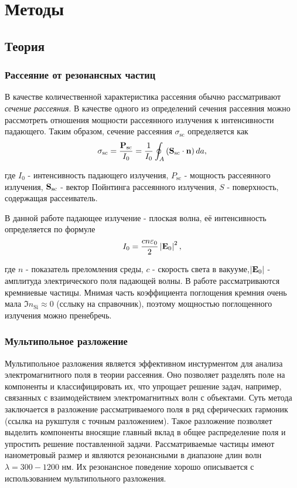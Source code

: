 \chapter{Методы}


\section{Теория}\label{sec:theory}

\subsection{Рассеяние от резонансных частиц}\label{subsec:scat_cs}

В качестве количественной характеристика рассеяния обычно рассматривают \textit{сечение рассеяния}. В качестве одного из определений сечения рассеяния можно рассмотреть отношения мощности рассеянного излучения к интенсивности падающего. Таким образом, сечение рассеяния $\sigma_{\text{sc}}$ определяется как
\begin{equation}
    \sigma_{\text{sc}} = \frac{\vb{P_{\text{sc}}}}{I_0} = \frac{1}{I_0} \oint_A  \left(  \mathbf{S}_{\text{sc}} \cdot \vb{n} \right) da,
\end{equation}

где $I_0$ - интенсивность падающего излучения, $P_{\text{sc}}$ - мощность рассеянного излучения, $\vb{S}_{\text{sc}}$ - вектор Пойнтинга рассеянного излучения, $S$ - поверхность, содержащая рассеиватель.

В данной работе падающее излучение - плоская волна, её интенсивность определяется по формуле
\begin{equation}
    I_0 = \frac{c n \varepsilon_0}{2} \left| \vb{E}_0 \right|^2,
\end{equation}

где $n$ - показатель преломления среды, $c$ - скорость света в вакууме,$\left| \vb{E}_0 \right|$ - амплитуда электрического поля падающей волны.
В работе рассматриваются кремниевые частицы. Мнимая часть коэффициента поглощения кремния очень мала $\Im{n_{\text{Si}}} \approx 0$ (сслыку на справочник), поэтому мощностью поглощенного излучения можно пренебречь. 

\subsection{Мультипольное разложение}\label{subsec:mult_decomp}

Мультипольное разложения является эффективном инстурментом для анализа электромагнитного поля в теории рассеяния. Оно позволяет разделять поле на компоненты и классифицировать их, что упрощает решение задач, например, связанных с взаимодействием электромагнитных волн с объектами. Суть метода заключается в разложение рассматриваемого поля в ряд сферических гармоник (ссылка на  рукштуля с точным разложением). Такое разложение позволяет выделить компоненты вносящие главный вклад в общее распределение поля и упростить решение поставленной задачи.
Рассматриваемые частицы имеют нанометровый размер и являются резонансными в диапазоне длин волн $\lambda = 300-1200$ нм. Их резонансное поведение хорошо описывается с использованием мультипольного разложения. 


